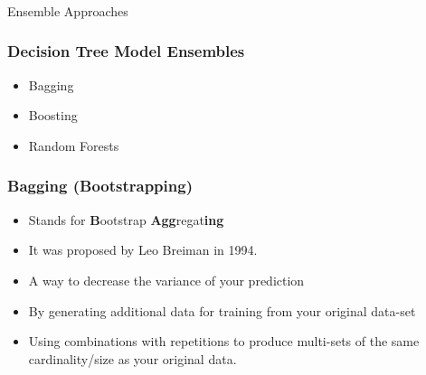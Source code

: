 \begin{frame}[fragile]\frametitle{}
\begin{center}
{\Large Ensemble Approaches}
\end{center}
\end{frame}

\begin{frame}[fragile]\frametitle{Decision Tree Model Ensembles}
\begin{itemize}
\item Bagging
\item Boosting
\item Random Forests
\end{itemize}
\end{frame}

\begin{frame}[fragile]\frametitle{Bagging (Bootstrapping)}
\begin{itemize}
\item Stands for {\bf B}ootstrap {\bf Agg}regat{\bf ing}
\item It was proposed by Leo Breiman in 1994.
\item A way to decrease the variance of your prediction
\item By generating additional data for training from your original data-set 
\item Using combinations with repetitions to produce multi-sets of the same cardinality/size as your original data.
\end{itemize}
\end{frame}

